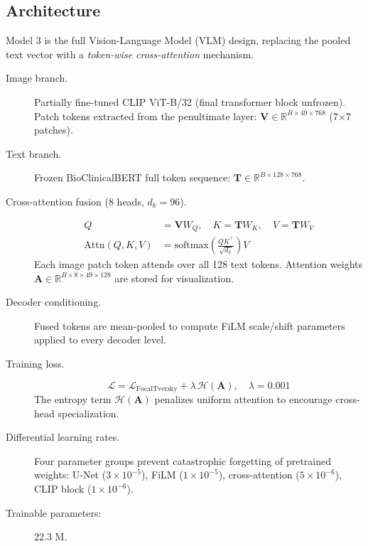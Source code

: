 \documentclass[12pt,a4paper]{article}
\begin{document}
\subsection{Architecture}
Model 3 is the full Vision-Language Model (VLM) design, replacing the
pooled text vector with a \textit{token-wise cross-attention} mechanism.

\begin{description}
  \item[Image branch.]
    Partially fine-tuned CLIP ViT-B/32 (final transformer block unfrozen).
    Patch tokens extracted from the penultimate layer:
    $\mathbf{V} \in \mathbb{R}^{B \times 49 \times 768}$ (7$\times$7 patches).

  \item[Text branch.]
    Frozen BioClinicalBERT full token sequence:
    $\mathbf{T} \in \mathbb{R}^{B \times 128 \times 768}$.

  \item[Cross-attention fusion (8 heads, $d_k=96$).]
    \begin{align}
      Q &= \mathbf{V}W_Q,\quad K = \mathbf{T}W_K,\quad V = \mathbf{T}W_V \\
      \text{Attn}(Q,K,V) &= \text{softmax}\!\left(\tfrac{QK^\top}{\sqrt{d_k}}\right)V
      \label{eq:crossattn}
    \end{align}
    Each image patch token attends over all 128 text tokens.
    Attention weights $\mathbf{A} \in \mathbb{R}^{B\times8\times49\times128}$
    are stored for visualization.

  \item[Decoder conditioning.]
    Fused tokens are mean-pooled to compute FiLM scale/shift parameters
    applied to every decoder level.

  \item[Training loss.]
    \begin{equation}
      \mathcal{L} = \mathcal{L}_{\text{FocalTversky}} + \lambda\,\mathcal{H}(\mathbf{A}),
      \quad \lambda = 0.001
      \label{eq:loss3}
    \end{equation}
    The entropy term $\mathcal{H}(\mathbf{A})$ penalizes uniform attention
    to encourage cross-head specialization.

  \item[Differential learning rates.]
    Four parameter groups prevent catastrophic forgetting of pretrained weights:
    U-Net ($3\times10^{-5}$), FiLM ($1\times10^{-5}$),
    cross-attention ($5\times10^{-6}$), CLIP block ($1\times10^{-6}$).

  \item[Trainable parameters:] 22.3 M.
\end{description}
\end{document}

